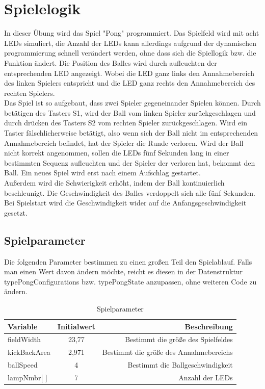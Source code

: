 \documentclass[a4paper]{article}
\begin{document}
    \section{Spielelogik}
     In dieser Übung wird das Spiel "Pong" programmiert. Das Spielfeld wird mit acht LEDs simuliert, die Anzahl der LEDs kann allerdings aufgrund der dynamischen programmierung schnell verändert werden, ohne dass sich die Spiellogik bzw. die Funktion ändert. Die Position des Balles wird durch aufleuchten der entsprechenden LED angezeigt. Wobei die LED ganz links den Annahmebereich des linken Spielers entspricht und die LED ganz rechts den Annahmebereich des rechten Spielers.\\
     Das Spiel ist so aufgebaut, dass zwei Spieler gegeneinander Spielen können. Durch betätigen des Tasters S1, wird der Ball vom linken Spieler zurückgeschlagen und durch drücken des Tasters S2 vom rechten Spieler zurückgeschlagen. Wird ein Taster fälschlicherweise betätigt, also wenn sich der Ball nicht im entsprechenden Annahmebereich befindet, hat der Spieler die Runde verloren. Wird der Ball nicht korrekt angenommen, sollen die LEDs fünf Sekunden lang in einer bestimmten Sequenz aufleuchten und der Spieler der verloren hat, bekommt den Ball. Ein neues Spiel wird erst nach einem Aufschlag gestartet.\\
     Außerdem wird die Schwierigkeit erhöht, indem der Ball kontinuierlich beschleunigt. Die Geschwindigkeit des Balles verdoppelt sich alle fünf Sekunden. Bei Spielstart wird die Geschwindigkeit wider auf die Anfangsgeschwindigkeit gesetzt.

     \subsection{Spielparameter}
      Die folgenden Parameter bestimmen zu einen großen Teil den Spielablauf. Falls man einen Wert davon ändern möchte, reicht es diesen in der Datenstruktur typePongConfigurations bzw. typePongState anzupassen, ohne weiteren Code zu ändern.
     \begin{table}[h!]
       \begin{center}
         \begin{tabular}{|l|c|r|}
        \hline 
           \textbf{Variable} & \textbf{Initialwert} & \textbf{Beschreibung}\\
           \hline
           fieldWidth & 23,77 & Bestimmt die größe des Spielfeldes\\
           \hline
           kickBackArea & 2,971 & Bestimmt die größe des Annahmebereichs\\
           \hline
           ballSpeed & 4 & Bestimmt die Ballgeschwindigkeit\\
           \hline
           lampNmbr[  ] & 7 & Anzahl der LEDs\\
           \hline
         \end{tabular}
         \caption{Spielparameter}
         \label{tab:Spielparameter}
       \end{center}
     \end{table}
\end{document}
